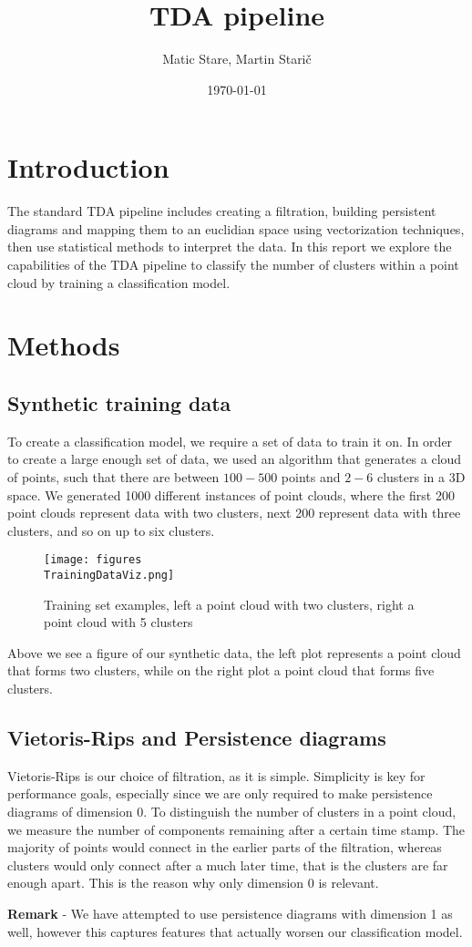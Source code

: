 \documentclass{article}
\title{TDA pipeline}
\author{Matic Stare, Martin Starič}
\date{\today}
\begin{document}
\maketitle

\tableofcontents
\newpage

\section{Introduction}
The standard TDA pipeline includes creating a filtration, building persistent diagrams and mapping them to an euclidian space using vectorization techniques, then use statistical methods to interpret the data. In this report we explore the capabilities of the TDA pipeline to classify the number of clusters within a point cloud by training a classification model.


\section{Methods}
\subsection{Synthetic training data}
To create a classification model, we require a set of data to train it on. In order to create a large enough set of data, we used an algorithm that generates a cloud of points, such that there are between $100-500$ points and $2-6$ clusters in a 3D space. We generated 1000 different instances of point clouds, where the first 200 point clouds represent data with two clusters, next 200 represent data with three clusters, and so on up to six clusters.

\begin{figure}[H]
    \centering
    \texttt{[image: figures\\TrainingDataViz.png]}
    \caption{Training set examples, left a point cloud with two clusters, right a point cloud with 5 clusters}
    \label{fig:Training set}
\end{figure}

Above we see a figure of our synthetic data, the left plot represents a point cloud that forms two clusters, while on the right plot a point cloud that forms five clusters.


\subsection{Vietoris-Rips and Persistence diagrams}
Vietoris-Rips is our choice of filtration, as it is simple. Simplicity is key for performance goals, especially since we are only required to make persistence diagrams of dimension 0. To distinguish the number of clusters in a point cloud, we measure the number of components remaining after a certain time stamp. The majority of points would connect in the earlier parts of the filtration, whereas clusters would only connect after a much later time, that is the clusters are far enough apart. This is the reason why only dimension 0 is relevant.\par
\textbf{Remark} - We have attempted to use persistence diagrams with dimension 1 as well, however this captures features that actually worsen our classification model.
\end{document}
